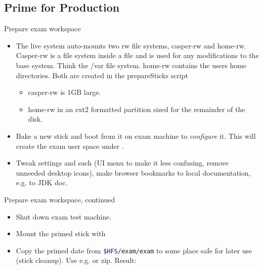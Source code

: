 \subsection[Production]{Prime for Production}
\begin{frame}{Prepare exam workspace}
  \begin{itemize}
  \item The live system auto-mounts two rw file systems, casper-rw and
    home-rw. Casper-rw is a file system inside a file and is used for
    any modifications to the base system. Think the /var file system.
    home-rw contains the users home  directories. Both are created in
    the prepareSticks script
    \begin{itemize}
    \item casper-rw is 1GB large.
    \item home-rw in an ext2 formatted partition sized for the
      remainder of the disk.
    \end{itemize}
  \item Bake a new stick and boot from it on exam machine to \textit{configure} it. This
    will create the exam user space under .
  \item Tweak settings and such (UI menu to make it less confusing,
    remove unneeded desktop icons), make browser bookmarks to local
    documentation, e.g. to JDK doc.
  \end{itemize}
\end{frame}

\begin{frame}{Prepare exam workspace, continued}
  \begin{itemize}
  \item Shut down exam test machine.
  \item Mount the primed stick with 
    
  \item Copy  the primed  date from
    \lstinline[language=sh,basicstyle={\normalsize},morekeywords={exam,$HFS}]{$HFS/exam/exam} %
    to some place safe 
    for later use (stick cleanup). Use e.g.  or
    zip. Result: 
\end{itemize}
\end{frame}

